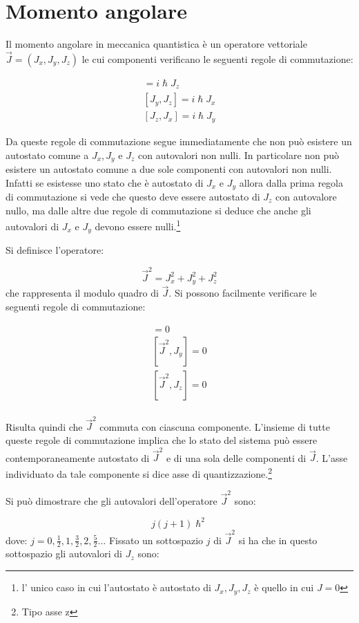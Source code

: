 \section{Momento angolare}
Il momento angolare in meccanica quantistica è un operatore vettoriale $\vec{J}=
(J_x, J_y, J_z)$ le cui componenti verificano le seguenti regole di
commutazione:

\begin{gather}
[J_x, J_y]= i\hslash J_z\\
[J_y, J_z]= i\hslash J_x\\
[J_z, J_x]= i\hslash J_y
\end{gather}

Da queste regole di commutazione segue immediatamente che non può esistere un
autostato comune a $J_x, J_y$ e $J_z$ con autovalori non nulli.
In particolare non può esistere un autostato comune a due sole componenti con
autovalori non nulli. Infatti se esistesse uno stato che è autostato di $J_x$ e
$J_y$ allora dalla
prima regola di commutazione si vede che questo deve essere autostato di $J_z$
con autovalore nullo, ma dalle altre due regole di commutazione si deduce che
anche gli autovalori di $J_x$ e $J_y$ devono essere nulli.\footnote{l' unico
caso in cui l'autostato è autostato di $J_x, J_y, J_z$ è quello in cui $J=0$}

Si definisce l'operatore:

\begin{equation}
\vec{J}^2=J_{x}^2+J_{y}^2+J_{z}^2
\end{equation}
che rappresenta il modulo quadro di $\vec{J}$. Si possono facilmente verificare
le seguenti regole di commutazione:

\begin{gather}
[\vec{J}^2,J_x]= 0\\
[\vec{J}^2,J_y]= 0\\
[\vec{J}^2,J_z]= 0\\
\end{gather}

Risulta quindi che $\vec{J}^2$ commuta con ciascuna componente.
L'insieme di tutte queste regole di commutazione implica che lo stato del
sistema può essere contemporaneamente autostato di $\vec{J}^2$ e di una sola
delle componenti di
$\vec{J}$. L'asse individuato da tale componente si dice asse di
quantizzazione.\footnote{Tipo asse z}

Si può dimostrare che gli autovalori dell'operatore $\vec{J}^2$ sono:

\begin{equation}
j(j+1)\hslash^2
\end{equation}
dove: $j=0,\frac{1}{2},1,\frac{3}{2},2,\frac{5}{2}\dots$ Fissato un sottospazio
$j$ di $\vec{J}^2$ si ha che in questo sottospazio gli autovalori di $J_z$ sono:

